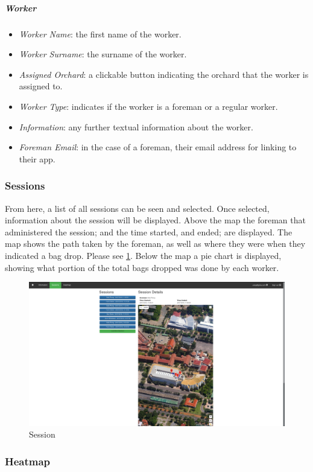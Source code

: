\documentclass[11pt]{article}
\begin{document}
\subparagraph{Worker}
\begin{itemize}
\item \textit{Worker Name}: the first name of the worker.
\item \textit{Worker Surname}: the surname of the worker.
\item \textit{Assigned Orchard}: a clickable button indicating the orchard that the worker is assigned to.
\item \textit{Worker Type}: indicates if the worker is a foreman or a regular worker.
\item \textit{Information}: any further textual information about the worker.
\item \textit{Foreman Email}: in the case of a foreman, their email address for linking to their app.
\end{itemize}
\subsubsection{Sessions}
\label{webSessions}
From here, a list of all sessions can be seen and selected. Once selected, information about the session will be displayed. Above the map the foreman that administered the session; and the time started, and ended; are displayed. The map shows the path taken by the foreman, as well as where they were when they indicated a bag drop. Please see \ref{webSession}. Below the map a pie chart is displayed, showing what portion of the total bags dropped was done by each worker.

\begin{figure}
 \centering
 \includegraphics[width=12cm, keepaspectratio]{Images/webSession.png}
 \caption{Session}
 \label{webSession}
\end{figure}

\subsubsection{Heatmap}
\label{webHeatmap}
\end{document}
